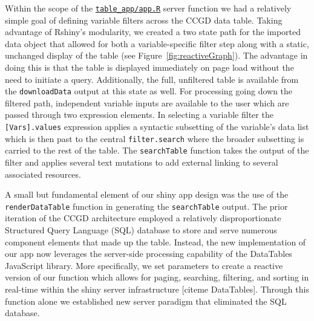 \documentclass[10pt]{report}
\begin{document}
Within the scope of the \href{https://github.com/ctastad/ccgd/blob/master/table_app/app.R}{\texttt{table\_app/app.R}} server function we had a relatively simple goal of defining variable filters across the CCGD data table. Taking advantage of Rshiny's modularity, we created a two state path for the imported data object that allowed for both a variable-specific filter step along with a static, unchanged display of the table (see Figure~\ref{fig:reactiveGraph}). The advantage in doing this is that the table is displayed immediately on page load without the need to initiate a query. Additionally, the full, unfiltered table is available from the \texttt{downloadData} output at this state as well. For processing going down the filtered path, independent variable inputs are available to the user which are passed through two expression elements. In selecting a variable filter the \texttt{[Vars].values} expression applies a syntactic subsetting of the variable's data list which is then past to the central \texttt{filter.search} where the broader subsetting is carried to the rest of the table. The \texttt{searchTable} function takes the output of the filter and applies several text mutations to add external linking to several associated resources.

A small but fundamental element of our shiny app design was the use of the \texttt{renderDataTable} function in generating the \texttt{searchTable} output. The prior iteration of the CCGD architecture employed a relatively disproportionate Structured Query Language (SQL) database to store and serve numerous component elements that made up the table. Instead, the new implementation of our app now leverages the server-side processing capability of the DataTables JavaScript library. More specifically, we set parameters to create a reactive version of our function which allows for paging, searching, filtering, and sorting in real-time within the shiny server infrastructure [citeme DataTables]. Through this function alone we established new server paradigm that eliminated the SQL database.
\end{document}
